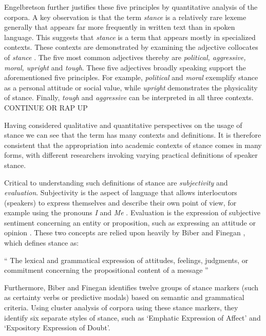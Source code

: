 \documentclass[Dissertation.tex]{subfiles}
\begin{document}
Engelbretson \cite{englebretsonStancetakingDiscourseSubjectivity2007} further justifies these five principles by quantitative analysis of the corpora. A key observation is that the term \textit{stance} is a relatively rare lexeme generally that appears far more frequently in written text than in spoken language. This suggests that \textit{stance} is a term that appears mostly in specialized contexts. These contexts are demonstrated by examining the adjective collocates of \textit{stance} \cite{englebretsonStancetakingDiscourseSubjectivity2007}. The five most common adjectives thereby are \textit{political, aggressive, moral, upright} and \textit{tough}. These five adjectives broadly speaking support the aforementioned five principles. For example, \textit{political} and \textit{moral} exemplify stance as a personal attitude or social value, while \textit{upright} demonstrates the physicality of stance. Finally, \textit{tough} and \textit{aggressive} can be interpreted in all three contexts. CONTINUE OR RAP UP


Having considered qualitative and quantitative perspectives on the usage of stance we can see that the term has many contexts and definitions.  It is therefore consistent that the appropriation into academic contexts of stance comes in many forms, with different researchers invoking varying practical definitions of speaker stance.

Critical to understanding such definitions of stance are \textit{subjectivity} and \textit{evaluation}. Subjectivity is the aspect of language that allows interlocutors (speakers)  to express themselves and describe their own point of view, for example using the pronouns \textit{I} and \textit{Me} \cite{matthewsSubjectivity2014}. Evaluation is the expression of subjective sentiment concerning an entity or proposition, such as expressing an attitude or opinion \cite{hunstonEvaluationTextAuthorial2000}. These two concepts are relied upon heavily by Biber and Finegan \cite{biberStylesStanceEnglish1989}, which defines stance as:

\begin{displayquote} `` The lexical and grammatical expression of attitudes, feelings, judgments, or commitment concerning the propositional content of a message ''
\end{displayquote}


Furthermore, Biber and Finegan \cite{biberStylesStanceEnglish1989} identifies twelve groups of stance markers (such as certainty verbs or predictive modals) based on semantic and grammatical criteria. Using cluster analysis of corpora using these stance markers, they identify six separate styles of stance, such as ‘Emphatic Expression of Affect’ and ‘Expository Expression of Doubt’. 
\end{document}
